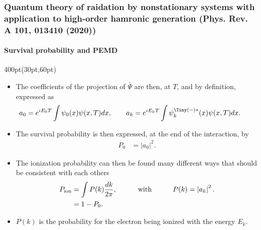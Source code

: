 \begin{frame}
\frametitle{Quantum theory of raidation by nonstationary systems 
	with application to high-order hamronic generation
        (Phys. Rev. A 101, 013410 (2020))}
	\framesubtitle{Survival probability and PEMD}

\begin{textblock*}{400pt}(30pt,60pt)
\footnotesize
\begin{itemize}
\item The coefficients of the projection of $\bar{\Psi}$ are then, at $T$,
and by definition, expressed as
\begin{equation}
a_0 = e^{iE_0 T}\int \psi_0(x) \psi(x,T)dx, \hspace{20pt}
a_k = e^{iE_k T}\int \psi_k^{\Tiny (-)*}(x) \psi(x,T)dx. \hspace{20pt}
\label{eqn:a0k}
\end{equation}



\item The survival probability is then expressed, 
at the end of the interaction, by
\begin{align}
   P_0         & = \left| a_0 \right|^2. \label{eqn:surv}  
\end{align}

\item The ionization probability can then be found many different 
ways that should be consistent with each others
\begin{align}
   P_{\rm ion} & = \int P(k)\frac{dk}{2\pi}, 
 \hspace{30pt} \mbox{with}\hspace{30pt} P(k) = \left| a_k \right|^2. 
\label{eqn:pion1} \\
               & = 1-P_0.
\end{align}

\item  $P(k)$ is the probability for the electron 
being ionized with the energy $E_k$.

\end{itemize}
\end{textblock*}


\end{frame}



